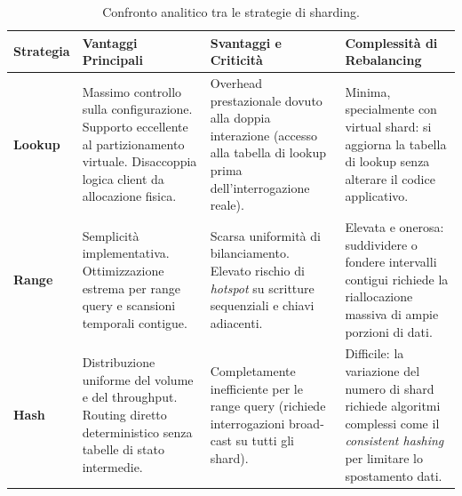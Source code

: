 \documentclass[11pt, a4paper]{article}
\begin{document}
\begin{table}[H]
\centering
\small
\caption{Confronto analitico tra le strategie di sharding.}
\label{tab:sharding_strategies}
\begin{tabularx}{\textwidth}{l p{4.2cm} p{4.2cm} p{4.5cm}}
\toprule
\textbf{Strategia} & \textbf{Vantaggi Principali} & \textbf{Svantaggi e Criticità} & \textbf{Complessità di Rebalancing} \\
\midrule
\textbf{Lookup} &
Massimo controllo sulla configurazione. Supporto eccellente al partizionamento virtuale. Disaccoppia logica client da allocazione fisica. &
Overhead prestazionale dovuto alla doppia interazione (accesso alla tabella di lookup prima dell'interrogazione reale). &
Minima, specialmente con virtual shard: si aggiorna la tabella di lookup senza alterare il codice applicativo. \\
\midrule
\textbf{Range} &
Semplicità implementativa. Ottimizzazione estrema per range query e scansioni temporali contigue. &
Scarsa uniformità di bilanciamento. Elevato rischio di \emph{hotspot} su scritture sequenziali e chiavi adiacenti. &
Elevata e onerosa: suddividere o fondere intervalli contigui richiede la riallocazione massiva di ampie porzioni di dati. \\
\midrule
\textbf{Hash} &
Distribuzione uniforme del volume e del throughput. Routing diretto deterministico senza tabelle di stato intermedie. &
Completamente inefficiente per le range query (richiede interrogazioni broad-cast su tutti gli shard). &
Difficile: la variazione del numero di shard richiede algoritmi complessi come il \emph{consistent hashing} per limitare lo spostamento dati. \\
\bottomrule
\end{tabularx}
\end{table}
\end{document}
